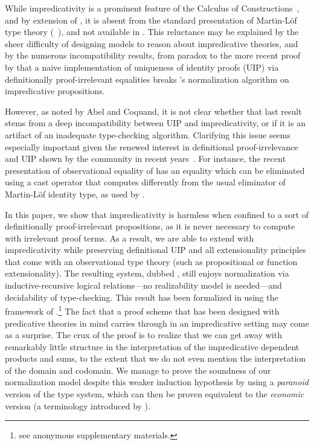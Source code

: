 While impredicativity is a prominent feature of the Calculus of
Constructions~, and by extension of \Coq, it is
absent from the standard presentation of Martin-Löf type theory
(\MLTT~), and not available in \Agda.
%
This reluctance may be explained by the sheer difficulty of designing models
to reason about impredicative theories, and by the numerous incompatibility
results, from  paradox to the more recent proof by
 that a naive implementation of uniqueness of identity
proofs (UIP) via definitionally proof-irrelevant equalities breaks \Coq's
normalization algorithm on impredicative propositions.

However, as noted by Abel and Coquand, it is not clear whether that last
result stems from a deep incompatibility between UIP and impredicativity,
or if it is an artifact of an inadequate type-checking algorithm.
%
Clarifying this issue seems especially important given the renewed
interest in definitional proof-irrelevance and UIP shown by the community
in recent years~.
%
For instance, the recent presentation \SetoidTT of observational
equality of  has an equality which can be
eliminated using a cast operator that computes differently from the
usual eliminator of Martin-Löf identity type, as used by .


In this paper, we show that impredicativity is harmless when confined
to a sort of definitionally proof-irrelevant propositions, as it is never
necessary to compute with irrelevant proof terms.
%
As a result, we are able to extend \SetoidTT with impredicativity while
preserving definitional UIP and all extensionality principles that come
with an observational type theory (such as propositional or function
extensionality).
%
The resulting system, dubbed \SetoidCC, still enjoys
normalization via inductive-recursive logical relations---no
realizability model is needed---and decidability of type-checking.
%
This result has been formalized in \Agda using the framework of
.\footnote{see anonymous supplementary
  materials.}
%
The fact that a proof scheme that has been designed with predicative
theories in mind carries through in an impredicative setting
may come as a surprise.
%
The crux of the proof is to realize that we can get away with
remarkably little structure in the interpretation of the impredicative
dependent products and sums, to the extent that we do not even mention the
interpretation of the domain and codomain.
%
We manage to prove the soundness of our normalization model
despite this weaker induction hypothesis by using a \emph{paranoid}
version of the type system, which can then be proven equivalent to the
\emph{economic} version (a terminology introduced by
).

